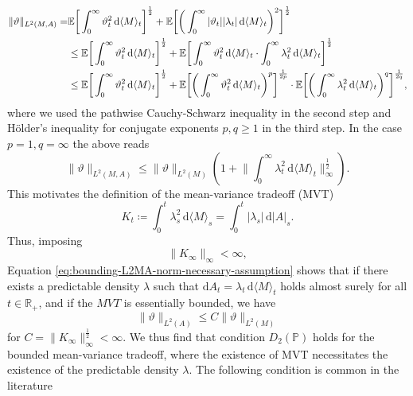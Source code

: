 \documentclass[11pt,a4paper,twoside,openany]{report}
\numberwithin{equation}{section}
\newcommand{\diff}{\mathrm{d}}
\theoremstyle{plain} %
\theoremstyle{definition} %
\theoremstyle{remark} %
\begin{document}
\begin{align}\label{eq:bounding-L2MA-norm-necessary-assumption}
\lVert \vartheta\rVert_{L^2(M,A)}
 =&\mathbb{E}\bigg[\int_0^{\infty} \vartheta_t^2\,\diff \langle M\rangle_t\bigg]^{\frac{1}{2}}
 +\mathbb{E}\bigg[\bigg(\int_0^{\infty} |\vartheta_t||\lambda_t|\,\diff\langle M\rangle_t\bigg)^2\bigg]^{\frac{1}{2}}\\
&\leq\mathbb{E}\bigg[\int_0^{\infty} \vartheta_t^2\,\diff \langle M\rangle_t\bigg]^{\frac{1}{2}}
 +\mathbb{E}\bigg[\int_0^{\infty}\vartheta_t^2\,\diff \langle M\rangle_t\cdot\int_0^{\infty}\lambda_t^2\,\diff \langle M\rangle_t\bigg]^{\frac{1}{2}}\notag \\
&\leq\mathbb{E}\bigg[\int_0^{\infty} \vartheta_t^2\,\diff \langle M\rangle_t\bigg]^{\frac{1}{2}}
 +\mathbb{E}\bigg[\bigg(\int_0^{\infty}\vartheta_t^2\,\diff \langle M\rangle_t\bigg)^{p}\bigg]^{\frac{1}{2p}}\cdot\mathbb{E}\bigg[\bigg(\int_0^{\infty}\lambda_t^2\,\diff \langle M\rangle_t\bigg)^{q}\bigg]^{\frac{1}{2q}}\notag 
,
\end{align}
where we used the pathwise Cauchy-Schwarz inequality in the second step and Hölder's inequality for conjugate exponents \(p,q\geq 1\) in the third step. In the case \(p=1,q=\infty\) the above reads
\begin{equation*}
    \lVert \vartheta\rVert_{L^2(M,A)}\leq\lVert \vartheta\rVert_{L^2(M)}(1+\lVert\int_0^{\infty}\lambda_t^2\,\diff \langle M\rangle_t\rVert_{\infty}^{\frac{1}{2}}).
\end{equation*}
This motivates the definition of the mean-variance tradeoff (MVT)  
\begin{equation*}
    K_t\coloneqq\int_0^{t}\lambda_s^2\,\diff \langle M\rangle_s=\int_0^{t}|\lambda_s|\,\diff |A|_s.
\end{equation*}
Thus, imposing
\begin{equation*}
    \lVert K_{\infty}\rVert_{\infty}<\infty,
\end{equation*}
Equation \eqref{eq:bounding-L2MA-norm-necessary-assumption} shows that if there exists a predictable density \(\lambda\) such that \(\diff A_t=\lambda_t\,\diff\langle M\rangle_t\) holds almost surely for all \(t\in\mathbb{R}_+\), and if the \(MVT\) is essentially bounded, we have
\begin{equation*}
    \lVert \vartheta\rVert_{L^2(A)}\leq C\lVert \vartheta\rVert_{L^2(M)}
\end{equation*} 
for \(C=\lVert K_{\infty}\rVert_{\infty}^{\frac{1}{2}}<\infty\). 
We thus find that condition \(D_2(\mathbb{P})\) holds for the bounded mean-variance tradeoff, where the existence of MVT necessitates the existence of the predictable density \(\lambda\).  The following condition is common in the literature
\end{document}
